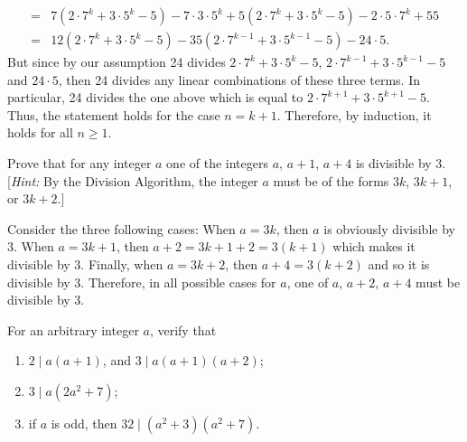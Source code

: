 \begin{solution}
\begin{enumerate}
\begin{align*}
            =& 7(2\cdot 7^k + 3\cdot 5^k - 5) - 7\cdot 3 \cdot 5^k + 5(2\cdot 7^k + 3\cdot 5^k - 5) - 2\cdot 5 \cdot 7^k + 55\\
            =& 12(2\cdot 7^k + 3\cdot 5^k - 5) - 35(2\cdot 7^{k-1} + 3\cdot 5^{k-1} - 5) - 24\cdot 5.
        \end{align*}
        But since by our assumption 24 divides $2\cdot 7^k + 3\cdot 5^k - 5$, $2\cdot 7^{k-1} + 3\cdot 5^{k-1} - 5$ and $24\cdot 5$, then 24 divides any linear combinations of these three terms. In particular, 24 divides the one above which is equal to $2\cdot 7^{k+1} + 3\cdot 5^{k+1} - 5$. Thus, the statement holds for the case $n = k+1$. Therefore, by induction, it holds for all $n \geq 1$.
    \end{enumerate}
\end{solution}

\begin{exercise}
    Prove that for any integer $a$ one of the integers $a$, $a+1$, $a+4$ is divisible by 3. [\textit{Hint:} By the Division Algorithm, the integer $a$ must be of the forms $3k$, $3k+1$, or $3k+2$.] \\
\end{exercise}

\begin{solution}
    Consider the three following cases: When $a = 3k$, then $a$ is obviously divisible by 3. When $a = 3k+1$, then $a + 2 = 3k+1 + 2 = 3(k+1)$ which makes it divisible by 3. Finally, when $a = 3k+2$, then $a + 4 = 3(k+2)$ and so it is divisible by 3. Therefore, in all possible cases for $a$, one of $a$, $a+2$, $a+4$ must be divisible by 3. \\
\end{solution}

\begin{exercise}
    For an arbitrary integer $a$, verify that
    \begin{enumerate}
        \item $2 \mid a(a+1)$, and $3 \mid a(a+1)(a+2)$;
        \item $3 \mid a(2a^2 + 7)$;
        \item if $a$ is odd, then $32 \mid (a^2 + 3)(a^2 + 7)$.
    \end{enumerate}
\end{exercise}


